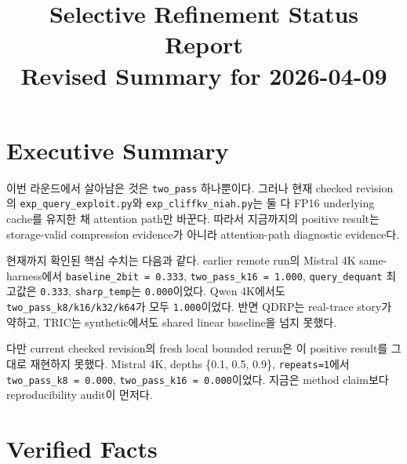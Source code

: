 \documentclass[11pt]{article}
\title{Selective Refinement Status Report\\Revised Summary for 2026-04-09}
\author{}
\date{}
\begin{document}
\maketitle

\section{Executive Summary}

이번 라운드에서 살아남은 것은 \texttt{two\_pass} 하나뿐이다. 그러나 현재 checked revision의
\texttt{exp\_query\_exploit.py}와 \texttt{exp\_cliffkv\_niah.py}는 둘 다 FP16 underlying cache를 유지한 채
attention path만 바꾼다. 따라서 지금까지의 positive result는 storage-valid compression evidence가 아니라
attention-path diagnostic evidence다.

현재까지 확인된 핵심 수치는 다음과 같다. earlier remote run의 Mistral 4K same-harness에서
\texttt{baseline\_2bit = 0.333}, \texttt{two\_pass\_k16 = 1.000},
\texttt{query\_dequant} 최고값은 \texttt{0.333}, \texttt{sharp\_temp}는 \texttt{0.000}이었다.
Qwen 4K에서도 \texttt{two\_pass\_k8/k16/k32/k64}가 모두 \texttt{1.000}이었다.
반면 QDRP는 real-trace story가 약하고, TRIC는 synthetic에서도 shared linear baseline을 넘지 못했다.

다만 current checked revision의 fresh local bounded rerun은 이 positive result를 그대로 재현하지 못했다.
Mistral 4K, depths \{0.1, 0.5, 0.9\}, \texttt{repeats=1}에서
\texttt{two\_pass\_k8 = 0.000}, \texttt{two\_pass\_k16 = 0.000}이었다.
지금은 method claim보다 reproducibility audit이 먼저다.

\section{Verified Facts}
\end{document}
